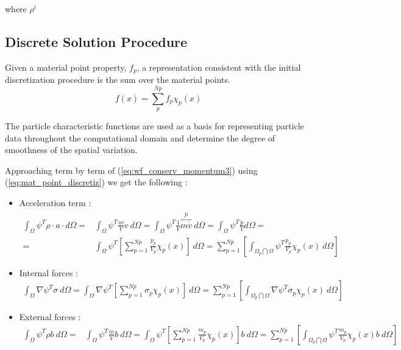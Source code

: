 where $\rho^i$

\subsection{Discrete Solution Procedure}
\label{sec:discr_sol_proc}

Given a material point property, $f_p$, a representation consistent
with the initial discretization procedure is the sum over the material
points.
\begin{equation}
  \label{eq:mat_point_discretiz}
  f(x) = \sum_p^{Np}f_p \chi_p(x)  
\end{equation}

The particle characteristic functions are used as a basis for
representing particle data throughout the computational domain and
determine the degree of smoothness of the spatial variation.

Approaching term by term of (\ref{eq:wf_conserv_momentum3}) using
(\ref{eq:mat_point_discretiz}) we get the following :



\begin{itemize}
\item Acceleration term :
  \begin{eqnarray}
    \label{eq:wf_conserv_momentum_acc}
   \int_{\Omega} \psi^T \rho \cdot a \cdot d\Omega =& \int_{\Omega} \psi^T \frac{m}{V}
                                                     \dot{v}\ d\Omega = \int_{\Omega} \psi^T \frac{1}{V}
                                                     \overbrace{m\dot{v}}^{\dot{p}}\ d\Omega = \int_{\Omega} \psi^T \frac{\dot{p}}{V} d\Omega = \nonumber \\
  =&  \int_{\Omega} \psi^T \left[ \sum^{Np}_{p=1} \frac{\dot{p}_p}{V_p} \chi_p(x) \right]\ d\Omega =
     \sum^{Np}_{p=1} \left[ \int_{\Omega_p \bigcap \Omega}
     \psi^T\frac{\dot{p}_p}{V_p}\chi_p(x)\ d\Omega \right] 
  \end{eqnarray}


\item Internal forces :
  \begin{align}
    \label{eq:wf_conserv_momentum_int_forces}
    \int_{\Omega}  \nabla \psi^T \sigma\ d\Omega = \int_{\Omega}  \nabla
    \psi^T \left[\sum^{Np}_{p=1} \sigma_p \chi_p(x) \right]\ d\Omega =
    \sum^{Np}_{p=1} \left[ \int_{\Omega_p \bigcap \Omega}
    \nabla\psi^T\sigma_p\chi_p(x)\ d\Omega \right]
  \end{align}
\item External forces :
  \begin{align}
    \label{eq:wf_conserv_momentum_ext_forces}
    \int_{\Omega} \psi^T \rho b\ d\Omega =& \int_{\Omega} \psi^T \frac{m}{V} b\
                                           d\Omega = \int_{\Omega} \psi^T \left[ \sum^{Np}_{p=1}
                                           \frac{m_p}{V_p}\chi_p(x) \right] b\ d\Omega = \sum_{p=1}^{Np}
                                           \left[ \int_{\Omega_p \bigcap \Omega}
                                           \psi^T \frac{m_p}{V_p} \chi_p(x) b\ d\Omega \right]
  \end{align}  
\end{itemize}

